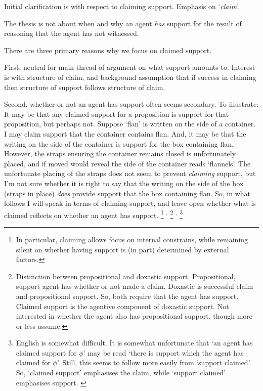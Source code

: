 \begin{note}
  Initial clarification is with respect to claiming support.
  Emphasis on `\emph{claim}'.

  The thesis is not about when and why an agent \emph{has} support for the result of reasoning that the agent has not witnessed.

  There are three primary reasons why we focus on claimed support.

  First, neutral for main thread of argument on what support amounts to.
  Interest is with structure of claim, and background assumption that if success in claiming then structure of support follows structure of claim.

  Second, whether or not an agent has support often seems secondary.
  To illustrate:
  It may be that any claimed support for a proposition is support for that proposition, but perhaps not.
  Suppose `flan' is written on the side of a container.
  I may claim support that the container contains flan.
  And, it may be that the writing on the side of the container is support for the box containing flan.
  However, the straps ensuring the container remains closed is unfortunately placed, and if moved would reveal the side of the container reads `flannels'.
  The unfortunate placing of the straps does not seem to prevent \emph{claiming} support, but I'm not sure whether it is right to say that the writing on the side of the box (straps in place) \emph{does} provide support that the box containing flan.
  So, in what follows I will speak in terms of claiming support, and leave open whether what is claimed reflects on whether an agent has support.\nolinebreak
  \footnote{
    In particular, claiming allows focus on internal constrains, while remaining silent on whether having support is (in part) determined by external factors.
  }
  \(^{,}\)\nolinebreak
  \footnote{
    Distinction between propositional and doxastic support.
    Propositional, support agent has whether or not made a claim.
    Doxastic is successful claim and propositional support.
    So, both require that the agent has support.
    Claimed support is the agentive component of doxastic support.
    Not interested in whether the agent also has propositional support, though more or less assume.
  }
  \(^{,}\)\nolinebreak
  \footnote{
    {
      \color{red}
      English is somewhat difficult.
      It is somewhat unfortunate that `an agent has claimed support for \(\phi\)' may be read `there is support which the agent has claimed for \(\phi\)'.
      Still, this seems to follow more easily from `support claimed'.
      So, `claimed support' emphasises the claim, while `support claimed' emphasises support.
    }
  }


\end{note}
